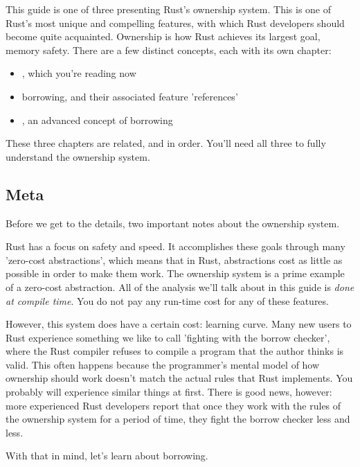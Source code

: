 This guide is one of three presenting Rust's ownership system. This is one of Rust's most unique and compelling features, with 
which Rust developers should become quite acquainted. Ownership is how Rust achieves its largest goal, memory safety. There are 
a few distinct concepts, each with its own chapter:

\begin{itemize}
  \item{, which you're reading now}
  \item{borrowing, and their associated feature 'references'}
  \item{, an advanced concept of borrowing}
\end{itemize}

These three chapters are related, and in order. You'll need all three to fully understand the ownership system.

\subsection*{Meta}

Before we get to the details, two important notes about the ownership system.

\blank

Rust has a focus on safety and speed. It accomplishes these goals through many 'zero-cost abstractions', which means that in 
Rust, abstractions cost as little as possible in order to make them work. The ownership system is a prime example of a zero-cost
abstraction. All of the analysis we'll talk about in this guide is \emph{done at compile time}. You do not pay any run-time cost 
for any of these features.

\blank

However, this system does have a certain cost: learning curve. Many new users to Rust experience something we like to call 
'fighting with the borrow checker', where the Rust compiler refuses to compile a program that the author thinks is valid. 
This often happens because the programmer's mental model of how ownership should work doesn't match the actual rules that Rust 
implements. You probably will experience similar things at first. There is good news, however: more experienced Rust developers 
report that once they work with the rules of the ownership system for a period of time, they fight the borrow checker less and less.

\blank

With that in mind, let's learn about borrowing.

